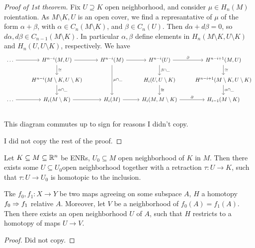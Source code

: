 \documentclass[language=english]{TemplateLecture}
\begin{document}
\begin{proof}[Proof of 1st theorem]
    Fix \(U \supseteq K\) open neighborhood, and consider \(\mu \in H_n(M)\) roientation. As \(M \setminus K, U\) is an open cover, we find a represantative of \(\mu\) of the form \(\alpha + \beta\), with \(\alpha \in C_n(M \setminus K)\), and \(\beta \in C_n(U)\). Then \(d\alpha + d\beta = 0\), so \(d\alpha, d\beta \in C_{n-1}(M \setminus K)\). In particular \(\alpha, \beta\) define elements in \(H_n(M\setminus K, U \setminus K)\) and \(H_n( U, U \setminus K)\), respectively. We have
    \[\begin{tikzcd}
        \dots \ar[r] & H^{n-i}(M, U) \ar[d, "\cong"] \ar[r] & H^{n-i}(M) \ar[dd, "\mu \cap \_"] \ar[r] & H^{n-i}(U) \ar[d, "\beta\cap \_"] \ar[r, "\partial"] & H^{n-i+1}(M,U) \ar[d, "\cong"] \\
        & H^{n-i}(M\setminus K, U \setminus K) \ar[d, "\alpha\cap \_"] & & H_i(U, U\setminus K) \ar[d, "\cong"] & H^{n-i+1}(M\setminus K, U \setminus K) \ar[d, "\alpha\cap \_"] \\
        \dots \ar[r] & H_i(M\setminus K) \ar[r] & H_i(M) \ar[r] & H_i(M, M\setminus K) \ar[r, "\partial"] & H_{i-1}(M \setminus K)\\
    \end{tikzcd}\]
    This diagram commutes up to sign for reasons I didn't copy.

    I did not copy the rest of the proof.
\end{proof}

\begin{proposition}
    Let \(K \subseteq M \subseteq \mathbb{R}^n\) be ENRs, \(U_0 \subseteq M\) open neighborhood of \(K\) in \(M\). Then there exists some \(U \subseteq U_0\)open neighborhood together with a retraction \(\tau\colon U \to K\), such that \(\tau\colon U \to U_0\) is homotopic to the inclusion.
\end{proposition}

\begin{lem}{}{}
    Tke \(f_0, f_1 \colon X \to Y\) be two maps agreeing on some subspace \(A\), \(H\) a homotopy \(f_0 \Rightarrow f_1\) relative \(A\). Moreover, let \(V\) be a neighborhood of \(f_0(A) = f_1(A)\). Then there exists an open neighborhood \(U\) of \(A\), such that \(H\) restricts to a homotopy of maps \(U \to V\).
\end{lem}

\begin{proof}
    Did not copy.
\end{proof}
\end{document}
